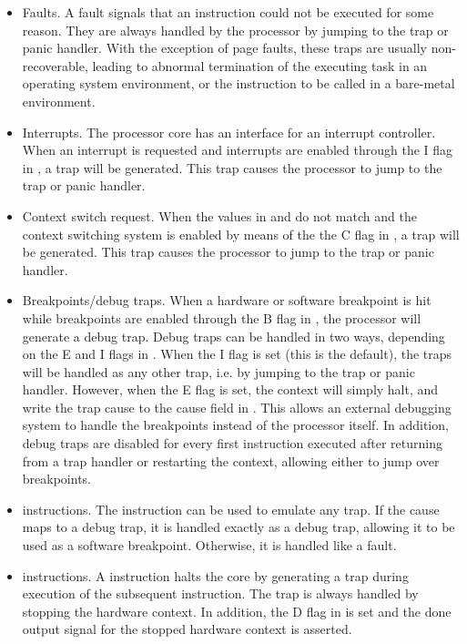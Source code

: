 \begin{itemize}

\item Faults. A fault signals that an instruction could not be executed for some
reason. They are always handled by the processor by jumping to the trap or panic
handler. With the exception of page faults, these traps are usually
non-recoverable, leading to abnormal termination of the executing task in an
operating system environment, or the  instruction to be called in a
bare-metal environment.

\item Interrupts. The \rvex{} processor core has an interface for an interrupt
controller. When an interrupt is requested and interrupts are enabled through
the I flag in , a  trap will be generated. This
trap causes the processor to jump to the trap or panic handler.

\item Context switch request. When the values in  and  do
not match and the context switching system is enabled by means of the the C flag
in , a  trap will be generated. This trap
causes the processor to jump to the trap or panic handler.

\item Breakpoints/debug traps. When a hardware or software breakpoint is hit 
while breakpoints are enabled through the B flag in , the processor 
will generate a debug trap. Debug traps can be handled in two ways, depending on 
the E and I flags in . When the I flag is set (this is the default), 
the traps will be handled as any other trap, i.e. by jumping to the trap or 
panic handler. However, when the E flag is set, the context will simply halt, 
and write the trap cause to the cause field in . This allows an 
external debugging system to handle the breakpoints instead of the processor 
itself. In addition, debug traps are disabled for every first instruction 
executed after returning from a trap handler or restarting the context, allowing 
either to jump over breakpoints.

\item {} instructions. The  instruction can be used to
emulate any trap. If the cause maps to a debug trap, it is handled exactly as a
debug trap, allowing it to be used as a software breakpoint. Otherwise, it is
handled like a fault.

\item {} instructions. A  instruction halts the core by
generating a  trap during execution of the subsequent instruction.
The  trap is always handled by stopping the hardware context. In
addition, the D flag in  is set and the done output signal for the
stopped hardware context is asserted.

\end{itemize}

